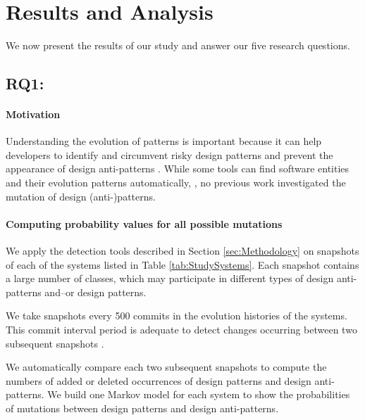 
\section{Results and Analysis}
\label{sec:Study Results}

We now present the results of our study and answer our five research questions. 

\subsection{\textbf{RQ1:} \textit{\RQOne}}

\paragraph{\textbf{Motivation}} Understanding the evolution of patterns is important because it can help developers to identify and circumvent risky design patterns and prevent the appearance of design anti-patterns \cite{jaafar2014anti}. While some tools can find software entities and their evolution patterns automatically, \eg{} \cite{van2002java,lanza2007object,rapu2004using,vaucher2009tracking}, no previous work investigated the mutation of design (anti-)patterns.

\paragraph{\textbf{Computing probability values for all possible mutations}} We apply the detection tools described in Section \ref{sec:Methodology} on snapshots of each of the systems listed in Table \ref{tab:StudySystems}. Each snapshot contains a large number of classes, which may participate in different types of design anti-patterns and--or design patterns. 

We take snapshots every 500 commits in the evolution histories of the systems. This commit interval period is adequate to detect changes occurring between two subsequent snapshots \cite{hassan2009predicting,canfora2010exploratory}.

We automatically compare each two subsequent snapshots to compute the numbers of added or deleted occurrences of design patterns and design anti-patterns. We build one Markov model for each system to show the probabilities of mutations between design patterns and design anti-patterns.

